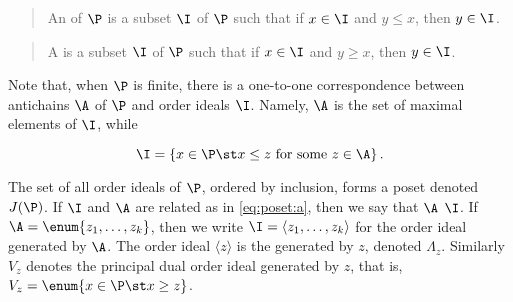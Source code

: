 \begin{quotation}
An  of $\P$ is a subset $\I$ of $\P$ such that if $x \in
\I$ and $y \le x$, then $y \in \I$.
\end{quotation}

\begin{quotation}
A  is a subset $\I$ of $\P$ such that if $x \in \I$
and $y \ge x$, then $y \in \I$.
\end{quotation}

Note that, when $\P$ is finite, there is a one-to-one correspondence between
antichains $\A$ of $\P$ and order ideals $\I$. Namely, $\A$ is the set of maximal
elements of $\I$, while

\begin{equation}
\label{eq:poset:a}
\I = \left\{{x \in \P \st x \le z ~\text{for some}~ z \in \A}\right\}.
\end{equation}

The set of all order ideals of $\P$, ordered by inclusion, forms a poset denoted
$J(\P)$. If $\I$ and $\A$ are related as in \ref{eq:poset:a}, then we say that $\A$
 $\I$. If $\A = \enum{z_1 , \ldots , z_k}$, then we
write $\I = \langle z_1 , \ldots , z_k \rangle$ for the order ideal generated by
$\A$. The order ideal $\langle z \rangle$ is the 
generated by $z$, denoted $\Lambda_z$. Similarly $V_z$ denotes the principal
dual order ideal generated by $z$, that is, $V_z = \enum{x \in \P \st x \ge
z}$.

